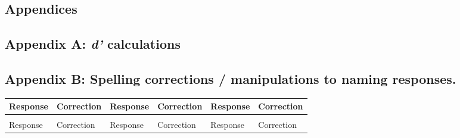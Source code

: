 \documentclass[
  11pt,
]{article}
\begin{document}
\newpage
\begin{landscape}

\hypertarget{appendices}{%
\section{Appendices}\label{appendices}}

\hypertarget{appendix-a-d-calculations}{%
\subsection{\texorpdfstring{Appendix A: \emph{d'}
calculations}{Appendix A: d' calculations}}\label{appendix-a-d-calculations}}

\newpage

\hypertarget{appendix-b-spelling-corrections-manipulations-to-naming-responses.}{%
\subsection{Appendix B: Spelling corrections / manipulations to naming
responses.}\label{appendix-b-spelling-corrections-manipulations-to-naming-responses.}}

\begingroup\fontsize{7}{9}\selectfont

\begin{longtable}{>{\raggedright\arraybackslash}p{2.6cm}>{\raggedright\arraybackslash}p{2.3cm}|>{\raggedright\arraybackslash}p{2.6cm}>{\raggedright\arraybackslash}p{2.3cm}|>{\raggedright\arraybackslash}p{2.6cm}>{\raggedright\arraybackslash}p{2.6cm}}
\toprule
Response & Correction & Response  & Correction  & Response   & Correction  \\
\midrule
\endfirsthead
\multicolumn{6}{@{}l}{\textit{(continued)}}\\
\toprule
Response & Correction & Response  & Correction  & Response   & Correction  \\
\midrule
\endhead


\end{longtable}
\end{landscape}
\end{document}
